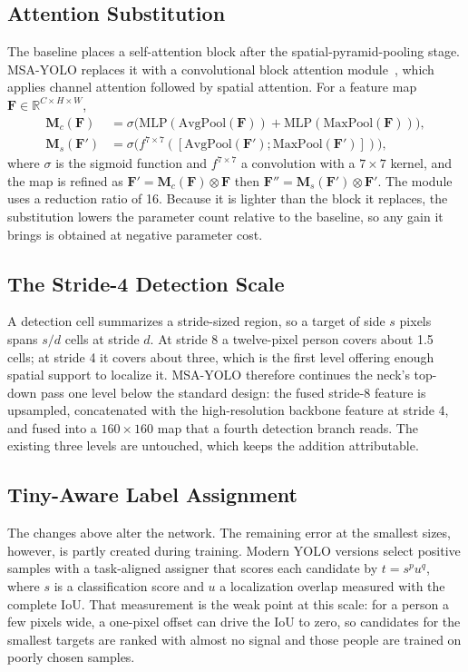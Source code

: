 \documentclass[conference,a4paper]{IEEEtran}
\begin{document}
\subsection{Attention Substitution}
The baseline places a self-attention block after the spatial-pyramid-pooling
stage. MSA-YOLO replaces it with a convolutional block attention
module~\cite{woo2018cbam}, which applies channel attention followed by spatial
attention. For a feature map $\mathbf{F} \in \mathbb{R}^{C \times H \times W}$,
\begin{align}
  \mathbf{M}_c(\mathbf{F}) &= \sigma\big(\mathrm{MLP}(\mathrm{AvgPool}(\mathbf{F}))
      + \mathrm{MLP}(\mathrm{MaxPool}(\mathbf{F}))\big), \\
  \mathbf{M}_s(\mathbf{F}') &= \sigma\big(f^{7\times7}([\mathrm{AvgPool}(\mathbf{F}');
      \mathrm{MaxPool}(\mathbf{F}')])\big),
\end{align}
where $\sigma$ is the sigmoid function and $f^{7\times7}$ a convolution with a
$7\times7$ kernel, and the map is refined as
$\mathbf{F}' = \mathbf{M}_c(\mathbf{F}) \otimes \mathbf{F}$ then
$\mathbf{F}'' = \mathbf{M}_s(\mathbf{F}') \otimes \mathbf{F}'$. The module uses a
reduction ratio of 16. Because it is lighter than the block it replaces, the
substitution lowers the parameter count relative to the baseline, so any gain it
brings is obtained at negative parameter cost.

\subsection{The Stride-4 Detection Scale}
A detection cell summarizes a stride-sized region, so a target of side $s$
pixels spans $s/d$ cells at stride $d$. At stride 8 a twelve-pixel person covers
about 1.5 cells; at stride 4 it covers about three, which is the first level
offering enough spatial support to localize it. MSA-YOLO therefore continues the
neck's top-down pass one level below the standard design: the fused stride-8
feature is upsampled, concatenated with the high-resolution backbone feature at
stride 4, and fused into a $160 \times 160$ map that a fourth detection branch
reads. The existing three levels are untouched, which keeps the addition
attributable.

\subsection{Tiny-Aware Label Assignment}
\label{sec:assign}
The changes above alter the network. The remaining error at the smallest sizes,
however, is partly created during training. Modern YOLO versions select positive
samples with a task-aligned assigner that scores each candidate by
$t = s^{p} u^{q}$, where $s$ is a classification score and $u$ a localization
overlap measured with the complete IoU. That measurement is the weak point at
this scale: for a person a few pixels wide, a one-pixel offset can drive the IoU
to zero, so candidates for the smallest targets are ranked with almost no signal
and those people are trained on poorly chosen samples.
\end{document}
